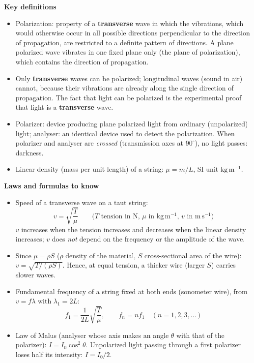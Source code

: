 \documentclass[11pt]{article}
\newcommand{\cle}[1]{{\popxbold\color{popdark}#1}}
\begin{document}
\begin{aretenir}
\textbf{Key definitions}
\begin{itemize}
\item \cle{Polarization}: property of a \textbf{transverse} wave in which the vibrations, which would otherwise occur in all possible directions perpendicular to the direction of propagation, are restricted to a definite pattern of directions. A \cle{plane polarized} wave vibrates in one fixed plane only (the plane of polarization), which contains the direction of propagation.
\item Only \textbf{transverse} waves can be polarized; longitudinal waves (sound in air) cannot, because their vibrations are already along the single direction of propagation. The fact that light can be polarized is the experimental proof that light is a \textbf{transverse} wave.
\item \cle{Polarizer}: device producing plane polarized light from ordinary (unpolarized) light; \cle{analyser}: an identical device used to detect the polarization. When polarizer and analyser are \emph{crossed} (transmission axes at $90^{\circ}$), no light passes: darkness.
\item \cle{Linear density} (mass per unit length) of a string: $\mu = m/L$, SI unit $\mathrm{kg\,m^{-1}}$.
\end{itemize}

\textbf{Laws and formulas to know}
\begin{itemize}
\item Speed of a transverse wave on a taut string:
\[ v=\sqrt{\dfrac{T}{\mu}} \qquad \text{($T$ tension in N, $\mu$ in $\mathrm{kg\,m^{-1}}$, $v$ in $\mathrm{m\,s^{-1}}$)} \]
$v$ increases when the tension increases and decreases when the linear density increases; $v$ does \emph{not} depend on the frequency or the amplitude of the wave.
\item Since $\mu=\rho S$ ($\rho$ density of the material, $S$ cross-sectional area of the wire): $v=\sqrt{T/(\rho S)}$. Hence, at equal tension, a thicker wire (larger $S$) carries slower waves.
\item Fundamental frequency of a string fixed at both ends (sonometer wire), from $v=f\lambda$ with $\lambda_1=2L$:
\[ f_1=\dfrac{1}{2L}\sqrt{\dfrac{T}{\mu}}, \qquad f_n=n f_1 \quad (n=1,2,3,\dots) \]
\item Law of Malus (analyser whose axis makes an angle $\theta$ with that of the polarizer): $I=I_0\cos^2\theta$. Unpolarized light passing through a first polarizer loses half its intensity: $I=I_0/2$.
\end{itemize}


\end{aretenir}
\end{document}
